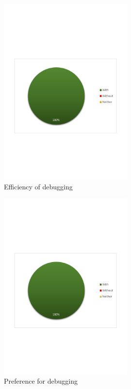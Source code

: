 \begin{figure}[H]
  \centering
    \includegraphics[width=0.6\textwidth]{images/charts/debugging_efficient.pdf}
	\caption{Efficiency of debugging}
	\label{fig:debugging_efficient}
\end{figure}

\begin{figure}[H]
  \centering
    \includegraphics[width=0.6\textwidth]{images/charts/prefer_debugging.pdf}
	\caption{Preference for debugging}
	\label{fig:prefer_debugging}
\end{figure}


